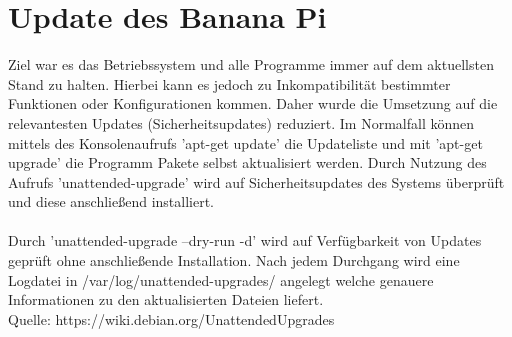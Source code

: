 \section{Update des Banana Pi}
Ziel war es das Betriebssystem und alle Programme immer auf dem aktuellsten Stand zu halten. Hierbei kann es jedoch zu Inkompatibilität bestimmter Funktionen  oder Konfigurationen kommen. Daher wurde die Umsetzung auf die relevantesten Updates (Sicherheitsupdates) reduziert. Im Normalfall können mittels des Konsolenaufrufs  'apt-get update' die Updateliste und mit 'apt-get upgrade' die Programm Pakete selbst aktualisiert werden. Durch Nutzung des Aufrufs 'unattended-upgrade' wird auf Sicherheitsupdates des Systems überprüft und diese anschließend installiert.\\
\\
Durch 'unattended-upgrade --dry-run -d' wird auf Verfügbarkeit von Updates geprüft ohne anschließende Installation. Nach jedem Durchgang wird eine Logdatei in /var/log/unattended-upgrades/ angelegt welche genauere Informationen zu den aktualisierten Dateien liefert.\\
Quelle: https://wiki.debian.org/UnattendedUpgrades \cite{update}
